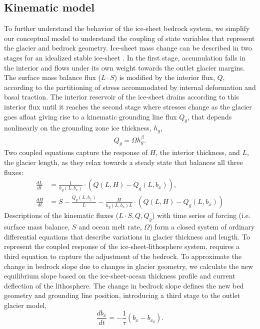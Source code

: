 \documentclass[tc, manuscript]{copernicus}
\begin{document}
\subsection{Kinematic model}

To further understand the behavior of the ice-sheet bedrock system, we simplify our conceptual model to understand the coupling of state variables that represent the glacier and bedrock geometry.
Ice-sheet mass change can be described in two stages for an idealized stable ice-sheet \citep{robel2018,christian2020}.
In the first stage, accumulation falls in the interior and flows under its own weight towards the outlet glacier margins.
The surface mass balance flux ($L\cdot S$) is modified by the interior flux, $Q$, according to the partitioning of stress accommodated by internal deformation and basal traction.
The interior reservoir of the ice-sheet drains according to this interior flux until it reaches the second stage where stresses change as the glacier goes afloat giving rise to a kinematic grounding line flux $Q_g$, that depends nonlinearly on the grounding zone ice thickness, $h_g$,
\begin{align}
Q_g=\Omega h_g^\beta.
\end{align}
 Two coupled equations capture the response of $H$, the interior thickness, and $L$, the glacier length, as they relax towards a steady state that balances all three fluxes:
 \begin{align}
\frac{dL}{dt} & = \frac{1}{h_g(L,b_x)}\cdot(Q(L,H)-Q_g(L,b_x)), \label{eqn:lengthchange} \\
\frac{dH}{dt} & = S-\frac{Q_g(L,b_x)}{L}-\frac{H}{h_g(L,b_x) L} \cdot (Q(L,H)-Q_g(L,b_x)) \label{eqn:thicknesschange}
\end{align}
Descriptions of the kinematic fluxes ($L\cdot S, Q, Q_g$) with time series of forcing (i.e. surface mass balance, $S$ and ocean melt rate, $\Omega$) form a closed system of ordinary differential equations that describe variations in glacier thickness and length. 
To represent the coupled response of the ice-sheet-lithosphere system, requires a third equation to capture the adjustment of the bedrock.
To approximate the change in bedrock slope due to changes in glacier geometry, we calculate the new equilibrium slope based on the ice-sheet-ocean thickness profile and current deflection of the lithosphere. 
The change in bedrock slope defines the new bed geometry and grounding line position, introducing a third stage to the outlet glacier model,
\begin{equation}
\frac{db_x}{dt} = -\frac{1}{\tau}(b_x - b_{x_0}). \label{eqn:slopechange}
\end{equation}
\end{document}
